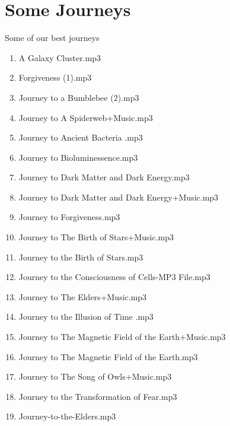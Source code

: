 \documentclass[12pt]{book}
\begin{document}
\appendix

\chapter{Some Journeys}
\label{sec:journeys}

Some of our best journeys
\begin{enumerate}
\item A Galaxy Cluster.mp3
\item Forgiveness (1).mp3
\item Journey to a Bumblebee (2).mp3
\item Journey to A Spiderweb+Music.mp3
\item Journey to Ancient Bacteria .mp3
\item Journey to Bioluminessence.mp3
\item Journey to Dark Matter and Dark Energy.mp3
\item Journey to Dark Matter and Dark Energy+Music.mp3
\item Journey to Forgiveness.mp3
\item Journey to The Birth of Stars+Music.mp3
\item Journey to the Birth of Stars.mp3
\item Journey to the Consciousness of Cells-MP3 File.mp3
\item Journey to The Elders+Music.mp3
\item Journey to the Illusion of Time .mp3
\item Journey to The Magnetic Field of the Earth+Music.mp3
\item Journey to The Magnetic Field of the Earth.mp3
\item Journey to The Song of Owls+Music.mp3
\item Journey to the Transformation of Fear.mp3
\item Journey-to-the-Elders.mp3
\end{enumerate}

\printbibliography

  
\end{document}
